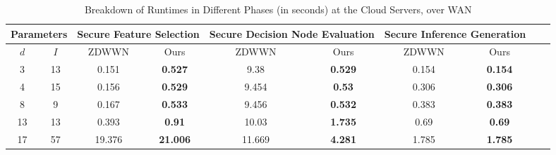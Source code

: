 \documentclass[10pt,journal,compsoc]{IEEEtran}
\begin{document}
\begin{table*}[t!]
\centering
\caption{Breakdown of Runtimes in Different Phases (in seconds) at the Cloud Servers, over WAN}
\setlength{\tabcolsep}{0.7em}
\renewcommand{\arraystretch}{1.2}
\begin{tabular}{@{}cccccccccc@{}}
\toprule
\multicolumn{2}{c}{Parameters} & \multicolumn{2}{c}{Secure Feature Selection} & \multicolumn{2}{c}{Secure Decision Node Evaluation} & \multicolumn{2}{c}{Secure Inference Generation}  \\ \midrule
$d$                & $I$                & ZDWWN          & Ours        & ZDWWN         & Ours         & ZDWWN          & Ours        \\ \midrule
3                & 13               &     0.151          &    \textbf{0.527}         &   9.38           &  \textbf{0.529}            &   0.154             & \textbf{0.154}                        \\
4                & 15               &    0.156           &    \textbf{0.529}         &    9.454           &  \textbf{0.53}           &   0.306             &\textbf{0.306}                    \\
8                & 9                &     0.167          &    \textbf{0.533}         &    9.456           &  \textbf{0.532}            &  0.383              & \textbf{0.383}                       \\
13               & 13               &        0.393       &     \textbf{0.91}        &      10.03         &   \textbf{1.735}           &  0.69              & \textbf{0.69}                       \\
17               & 57               &     19.376          &      \textbf{21.006}       &   11.669            &   \textbf{4.281}           & 1.785
               &         \textbf{1.785}
              \\ \bottomrule
\end{tabular}
\label{table:cost}
\end{table*}
\end{document}
